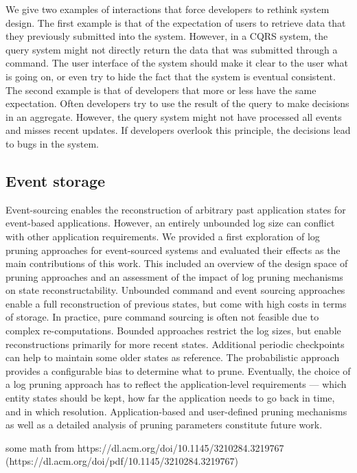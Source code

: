 We give two examples of interactions that force developers to rethink system design. The first example is that of the expectation of users to retrieve data that they previously submitted into the system. However, in a CQRS system, the query system might not directly return the data that was submitted through a command. The user interface of the system should make it clear to the user what is going on, or even try to hide the fact that the system is eventual consistent. The second example is that of developers that more or less have the same expectation. Often developers try to use the result of the query to make decisions in an aggregate. However, the query system might not have processed all events and misses recent updates. If developers overlook this principle, the decisions lead to bugs in the system.

\subsection{Event storage}

Event-sourcing enables the reconstruction of arbitrary past application states for event-based applications. However, an entirely
unbounded log size can conflict with other application requirements. We provided a first exploration of log pruning approaches
for event-sourced systems and evaluated their effects as the main
contributions of this work. This included an overview of the design
space of pruning approaches and an assessment of the impact of
log pruning mechanisms on state reconstructability.
Unbounded command and event sourcing approaches enable
a full reconstruction of previous states, but come with high costs
in terms of storage. In practice, pure command sourcing is often
not feasible due to complex re-computations. Bounded approaches
restrict the log sizes, but enable reconstructions primarily for more
recent states. Additional periodic checkpoints can help to maintain
some older states as reference. The probabilistic approach provides
a configurable bias to determine what to prune. Eventually, the
choice of a log pruning approach has to reflect the application-level
requirements — which entity states should be kept, how far the
application needs to go back in time, and in which resolution.
Application-based and user-defined pruning mechanisms as well
as a detailed analysis of pruning parameters constitute future work.

some math from https://dl.acm.org/doi/10.1145/3210284.3219767 (https://dl.acm.org/doi/pdf/10.1145/3210284.3219767)


